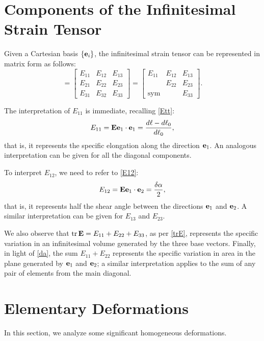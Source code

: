 \section{Components of the Infinitesimal Strain Tensor}
Given a Cartesian basis $\{\mathbf{e}_i\}$, the infinitesimal strain tensor can be represented in matrix form as follows:
\begin{equation}
	[\Eb]=\begin{bmatrix}E_{11}&E_{12}&E_{13}\\E_{21}&E_{22}&E_{23}\\E_{31}&E_{32}&E_{33}\end{bmatrix}=\begin{bmatrix}E_{11}&E_{12}&E_{13}\\&E_{22}&E_{23}\\\mathrm{sym}&&E_{33}\end{bmatrix}.
\end{equation}

The interpretation of $E_{11}$ is immediate, recalling \eqref{Ett}:
\begin{equation}
	E_{11}=\mathbf{E}\mathbf{e}_1\cdot\mathbf{e}_1=\frac{d\ell-d\ell_0}{d\ell_0},
\end{equation}
that is, it represents the specific elongation along the direction $\mathbf{e}_1$. An analogous interpretation can be given for all the diagonal components.

To interpret $E_{12}$, we need to refer to \eqref{E12}: 
\begin{equation}
	E_{12}=\mathbf{E}\mathbf{e}_1\cdot\mathbf{e}_2=\frac{\delta\alpha}{2},
\end{equation}
that is, it represents half the shear angle between the directions $\mathbf{e}_1$ and $\mathbf{e}_2$. A similar interpretation can be given for $E_{13}$ and $E_{23}$.

We also observe that $\operatorname{tr}\mathbf{E}=E_{11}+E_{22}+E_{33}$, as per \eqref{trE}, represents the specific variation in an infinitesimal volume generated by the three base vectors. Finally, in light of \eqref{da}, the sum $E_{11}+E_{22}$ represents the specific variation in area in the plane generated by $\mathbf{e}_1$ and $\mathbf{e}_2$; a similar interpretation applies to the sum of any pair of elements from the main diagonal.

\section{Elementary Deformations}
In this section, we analyze some significant homogeneous deformations.

